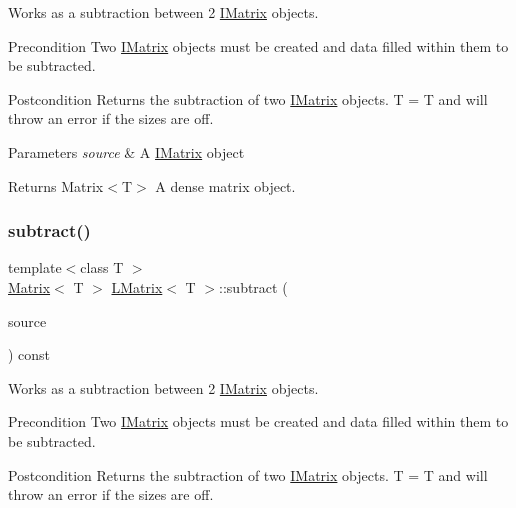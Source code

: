 Works as a subtraction between 2 \mbox{\hyperlink{class_i_matrix}{I\+Matrix}} objects. 

\begin{DoxyPrecond}{Precondition}
Two \mbox{\hyperlink{class_i_matrix}{I\+Matrix}} objects must be created and data filled within them to be subtracted. 
\end{DoxyPrecond}
\begin{DoxyPostcond}{Postcondition}
Returns the subtraction of two \mbox{\hyperlink{class_i_matrix}{I\+Matrix}} objects. T = T and will throw an error if the sizes are off.
\end{DoxyPostcond}

\begin{DoxyParams}{Parameters}
{\em source} & A \mbox{\hyperlink{class_i_matrix}{I\+Matrix}} object \\
\hline
\end{DoxyParams}
\begin{DoxyReturn}{Returns}
Matrix$<$\+T$>$ A dense matrix object. 
\end{DoxyReturn}
\mbox{\label{class_l_matrix_a4e030fc2936788b67a587e2eee786076}} 
\subsubsection{\texorpdfstring{subtract()}{subtract()}\hspace{0.1cm}{\footnotesize\ttfamily [6/6]}}
{\footnotesize\ttfamily template$<$class T $>$ \\
\mbox{\hyperlink{class_matrix}{Matrix}}$<$ T $>$ \mbox{\hyperlink{class_l_matrix}{L\+Matrix}}$<$ T $>$\+::subtract (\begin{DoxyParamCaption}\item[{const \mbox{\hyperlink{class_i_matrix}{I\+Matrix}}$<$ \mbox{\hyperlink{class_d_matrix}{D\+Matrix}}$<$ T $>$, T $>$ \&}]{source }\end{DoxyParamCaption}) const}



Works as a subtraction between 2 \mbox{\hyperlink{class_i_matrix}{I\+Matrix}} objects. 

\begin{DoxyPrecond}{Precondition}
Two \mbox{\hyperlink{class_i_matrix}{I\+Matrix}} objects must be created and data filled within them to be subtracted. 
\end{DoxyPrecond}
\begin{DoxyPostcond}{Postcondition}
Returns the subtraction of two \mbox{\hyperlink{class_i_matrix}{I\+Matrix}} objects. T = T and will throw an error if the sizes are off.
\end{DoxyPostcond}

